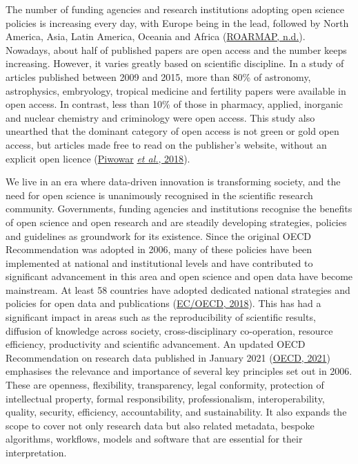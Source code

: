 \documentclass[
]{book}
\begin{document}
The number of funding agencies and research institutions adopting open science policies is increasing every day, with Europe being in the lead, followed by North America, Asia, Latin America, Oceania and Africa (\href{https://roarmap.eprints.org/}{ROARMAP, n.d.}). Nowadays, about half of published papers are open access and the number keeps increasing. However, it varies greatly based on scientific discipline. In a study of articles published between 2009 and 2015, more than 80\% of astronomy, astrophysics, embryology, tropical medicine and fertility papers were available in open access. In contrast, less than 10\% of those in pharmacy, applied, inorganic and nuclear chemistry and criminology were open access. This study also unearthed that the dominant category of open access is not green or gold open access, but articles made free to read on the publisher's website, without an explicit open licence (\href{https://peerj.com/articles/4375/?utm_source=TrendMD\&utm_campaign=PeerJ_Tre\%20ndMD_0\&utm_medium=TrendMD}{Piwowar} \href{https://peerj.com/articles/4375/?utm_source=TrendMD\&utm_campaign=PeerJ_Tre\%20ndMD_0\&utm_medium=TrendMD}{\emph{et al.}, 2018}).

We live in an era where data-driven innovation is transforming society, and the need for open science is unanimously recognised in the scientific research community. Governments, funding agencies and institutions recognise the benefits of open science and open research and are steadily developing strategies, policies and guidelines as groundwork for its existence. Since the original OECD Recommendation was adopted in 2006, many of these policies have been implemented at national and institutional levels and have contributed to significant advancement in this area and open science and open data have become mainstream. At least 58 countries have adopted dedicated national strategies and policies for open data and publications (\href{https://stip.oecd.org/stip.html}{EC/OECD, 2018}). This has had a significant impact in areas such as the reproducibility of scientific results, diffusion of knowledge across society, cross-disciplinary co-operation, resource efficiency, productivity and scientific advancement. An updated OECD Recommendation on research data published in January 2021 (\href{https://www.oecd.org/sti/recommendation-access-to-research-data-from-public-funding.htm\#:~:text=On\%2020\%20January\%202021\%2C\%20the,shown\%20in\%20the\%20figure\%20below.}{OECD, 2021}) emphasises the relevance and importance of several key principles set out in 2006. These are openness, flexibility, transparency, legal conformity, protection of intellectual property, formal responsibility, professionalism, interoperability, quality, security, efficiency, accountability, and sustainability. It also expands the scope to cover not only research data but also related metadata, bespoke algorithms, workflows, models and software that are essential for their interpretation.
\end{document}
